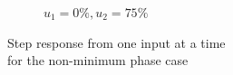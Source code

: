 \begin{figure}[h!t]
\begin{subfigure}[b]{0.45\columnwidth}
                \caption{$u_1 = 0\%, u_2 = 75\%$}
        \end{subfigure}
        \caption{Step response from one input at a time \\ for the non-minimum phase case} 
        \label{steprepnonmin}
\end{figure}

